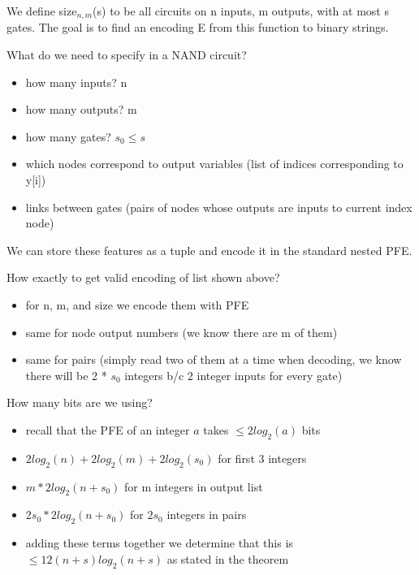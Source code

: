 {
    We define size$_{n, m}$(s) to be all circuits on n inputs, m outputs, with at most s gates. The goal is to find an encoding E from this function to binary strings.

    What do we need to specify in a NAND circuit?
    \begin{itemize}
        \item how many inputs? n
        \item how many outputs? m
        \item how many gates? $s_0 \le s$
        \item which nodes correspond to output variables (list of indices corresponding to y[i])
        \item links between gates (pairs of nodes whose outputs are inputs to current index node)
    \end{itemize}

    We can store these features as a tuple and encode it in the standard nested PFE.

    \begin{example}
        \begin{center}
        \end{center}
    \end{example}

    How exactly to get valid encoding of list shown above?
    \begin{itemize}
        \item for n, m, and size we encode them with PFE
        \item same for node output numbers (we know there are m of them)
        \item same for pairs (simply read two of them at a time when decoding, we know there will be 2 * $s_0$ integers b/c 2 integer inputs for every gate)
    \end{itemize}

    How many bits are we using?
    \begin{itemize}
        \item recall that the PFE of an integer $a$ takes $\le 2log_2(a)$ bits
        \item $2log_2(n) + 2log_2(m) + 2 log_2(s_0)$ for first 3 integers
        \item $m * 2log_2(n + s_0)$ for m integers in output list
        \item $2s_0 * 2log_2(n + s_0)$ for $2s_0$ integers in pairs
        \item adding these terms together we determine that this is $\le 12(n+s)log_2(n+s)$ as stated in the theorem
    \end{itemize}
}

